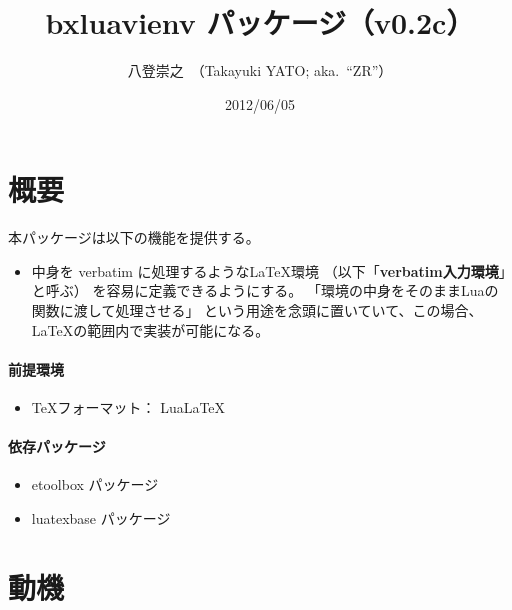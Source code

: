 \documentclass[a4paper]{ltjsarticle}
\newcommand{\PkgVersion}{0.2c}
\newcommand{\PkgDate}{2012/06/05}
\newcommand{\Pkg}[1]{\textsf{#1}}
\newcommand{\Jemph}{\textbf}
\begin{document}
\title{\Pkg{bxluavienv} パッケージ（v\PkgVersion）}
\author{八登崇之\ （Takayuki YATO; aka.~``ZR''）}
\date{\PkgDate}
\maketitle

\section{概要}
\label{sec:overview}

本パッケージは以下の機能を提供する。
\begin{itemize}
\item 中身を verbatim に処理するような{\LaTeX}環境
  （以下「\Jemph{verbatim入力環境}」と呼ぶ）
  を容易に定義できるようにする。
  「環境の中身をそのままLuaの関数に渡して処理させる」
  という用途を念頭に置いていて、この場合、
  {\LaTeX}の範囲内で実装が可能になる。
\end{itemize}

\paragraph{前提環境}
\begin{itemize}
\item {\TeX}フォーマット： Lua{\LaTeX}
\end{itemize}

\paragraph{依存パッケージ}
\begin{itemize}
\item \Pkg{etoolbox} パッケージ
\item \Pkg{luatexbase} パッケージ
\end{itemize}

\section{動機}
\label{sec:motivation}
\end{document}
